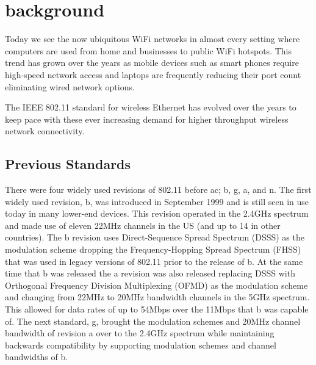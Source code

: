 \section{background}

Today we see the now ubiquitous WiFi networks in almost every setting where computers are used from home and businesses to public WiFi hotspots. This trend has grown over the years as mobile devices such as smart phones require high-speed network access and laptops are frequently reducing their port count eliminating wired network options.

The IEEE 802.11 standard for wireless Ethernet has evolved over the years to keep pace with these ever increasing demand for higher throughput wireless network connectivity.

\subsection{Previous Standards}
There were four widely used revisions of 802.11 before ac; b, g, a, and n. The first widely used revision, b, was introduced in September 1999 and is still seen in use today in many lower-end devices. This revision operated in the 2.4GHz spectrum and made use of eleven 22MHz channels in the US (and up to 14 in other countries). The b revision uses Direct-Sequence Spread Spectrum (DSSS) as the modulation scheme dropping the Frequency-Hopping Spread Spectrum (FHSS) that was used in legacy versions of 802.11 prior to the release of b. At the same time that b was released the a revision was also released replacing DSSS with Orthogonal Frequency Division Multiplexing (OFMD) as the modulation scheme and changing from 22MHz to 20MHz bandwidth channels in the 5GHz spectrum. This allowed for data rates of up to 54Mbps over the 11Mbps that b was capable of. The next standard, g, brought the modulation schemes and 20MHz channel bandwidth of revision a over to the 2.4GHz spectrum while maintaining backwards compatibility by supporting modulation schemes and channel bandwidths of b. 

